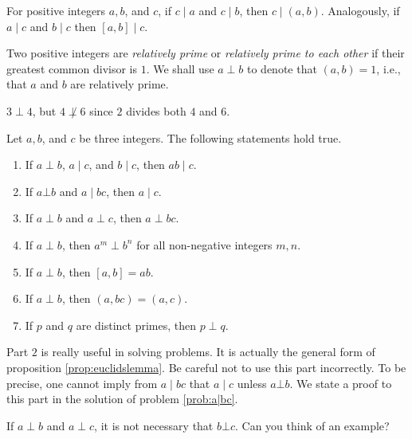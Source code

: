 \begin{proposition}\label{prop:dividegcd}
	For positive integers $a, b$, and $c$, if $c \mid a$ and $c\mid b$, then $c\mid (a,b)$. Analogously, if $a\mid c$ and $b\mid c$ then $[a,b]\mid c$.
\end{proposition}

\begin{definition}
	Two positive integers are \textit{relatively prime} or \textit{relatively prime to each other} if their greatest common divisor is $1$. We shall use $a\perp b$ to denote that $(a,b)=1$, i.e., that $a$ and $b$ are relatively prime.
\end{definition}

\begin{example}
	$3\perp4$, but $4\not\perp6$ since $2$ divides both $4$ and $6$.
\end{example}

\begin{proposition}\label{prop:cpdiv}
	Let $a, b$, and $c$ be three integers. The following statements hold true.
	\begin{enumerate}
		\item If $a\perp b$, $a\mid c$, and $b\mid c$, then $ab\mid c$.
		\item If $a \bot b$ and $a\mid bc$, then $a\mid c$.
		\item If $a\perp b$ and $a\perp c$, then $a\perp bc$.
		\item If $a\perp b$, then $a^m\perp b^n$ for all non-negative integers $m,n$.
		\item If $a \perp b$, then $[a,b]=ab$.
		\item If $a \perp b$, then $(a,bc)=(a,c)$.
		\item If $p$ and $q$ are distinct primes, then $p \perp q$.
	\end{enumerate}
\end{proposition}

\begin{note}[1]
	Part $2$ is really useful in solving problems. It is actually the general form of proposition \eqref{prop:euclidslemma}. Be careful not to use this part incorrectly. To be precise, one cannot imply from $a\mid bc$ that $a\mid c$ unless $a \bot b$. We state a proof to this part in the solution of problem \eqref{prob:a|bc}.
\end{note}

\begin{note}[2]
	If $a\perp b$ and $a\perp c$, it is not necessary that $b \bot c$. Can you think of an example?
\end{note}

